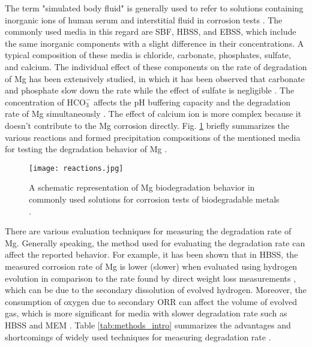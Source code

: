 The term "simulated body fluid" is generally used to refer to solutions containing inorganic ions of human serum and interstitial fluid in corrosion tests \cite{Mei2020}. The commonly used media in this regard are SBF, HBSS, and EBSS, which include the same inorganic components with a slight difference in their concentrations. A typical composition of these media is chloride, carbonate, phosphates, sulfate, and calcium. The individual effect of these components on the rate of degradation of Mg has been extensively studied, in which it has been observed that carbonate and phosphate slow down the rate while the effect of sulfate is negligible \cite{Johnston2017,Mei2019a}. The concentration of $\mathrm{HCO}_{3}^{-}$ affects the pH buffering capacity and the degradation rate of Mg simultaneously \cite{Xin2011}. The effect of calcium ion is more complex because it doesn't contribute to the Mg corrosion directly. Fig. \ref{fig:reactions_intro} briefly summarizes the various reactions and formed precipitation compositions of the mentioned media for testing the degradation behavior of Mg \cite{Mei2020}.


\begin{figure}
\centering
\medskip
\texttt{[image: reactions.jpg]}
\caption[Mg biodegradation behavior in commonly used test solutions]{A schematic representation of Mg biodegradation behavior in commonly used solutions for corrosion tests of biodegradable metals \cite{Mei2020}.} \label{fig:reactions_intro}
\end{figure}


There are various evaluation techniques for measuring the degradation rate of Mg. Generally speaking, the method used for evaluating the degradation rate can affect the reported behavior. For example, it has been shown that in HBSS, the measured corrosion rate of Mg is lower (slower) when evaluated using  hydrogen evolution in comparison to the rate found by direct weight loss measurements \cite{Johnston2015,Johnston2019}, which can be due to the secondary dissolution of evolved hydrogen. Moreover, the consumption of oxygen due to secondary ORR can affect the volume of evolved gas, which is more significant for media with slower degradation rate such as HBSS and MEM \cite{Wang2020}. Table \ref{tab:methods_intro} summarizes the advantages and shortcomings of widely used techniques for measuring degradation rate \cite{Mei2020}. 


